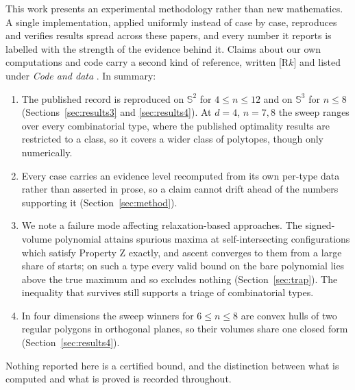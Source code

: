 This work presents an experimental methodology rather than new mathematics. A
single implementation, applied uniformly instead of case by case, reproduces
and verifies results spread across these papers, and every number it reports is
labelled with the strength of the evidence behind it. Claims about our own
computations and code carry a second kind of reference, written [R$k$] and
listed under \emph{Code and data} . In summary:

\begin{enumerate}
  \item The published record is reproduced on $\mathbb{S}^{2}$ for
    $4 \leq n \leq 12$ and on $\mathbb{S}^{3}$ for
    $n \leq 8$ (Sections~\ref{sec:results3} and \ref{sec:results4}). At $d = 4$,
    $n = 7, 8$ the sweep ranges over every combinatorial type, where the
    published optimality results are restricted to a class, so it covers a
    wider class of polytopes, though only numerically.
  \item Every case carries an evidence level recomputed from its own per-type
    data rather than asserted in prose, so a claim cannot drift ahead of the
    numbers supporting it (Section~\ref{sec:method}).
  \item We note a failure mode affecting relaxation-based approaches. The
    signed-volume polynomial attains spurious maxima at self-intersecting
    configurations which satisfy Property Z exactly, and ascent converges to
    them from a large share of starts; on such a type every valid bound on the
    bare polynomial lies above the true maximum and so excludes nothing
    (Section~\ref{sec:trap}). The inequality that survives still supports a
    triage of combinatorial types.
  \item In four dimensions the sweep winners for $6 \leq n \leq 8$ are convex
    hulls of two regular polygons in orthogonal planes, so their volumes share
    one closed form (Section~\ref{sec:results4}).
\end{enumerate}

Nothing reported here is a certified bound, and the distinction between what is
computed and what is proved is recorded throughout.
